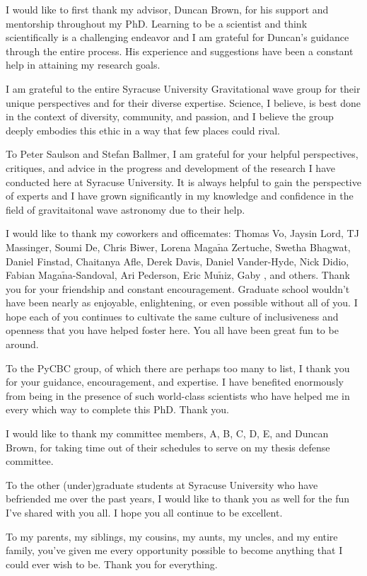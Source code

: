 I would like to first thank my advisor, Duncan Brown, for his support and mentorship throughout my PhD. Learning
to be a scientist and think scientifically is a challenging endeavor and I am grateful for Duncan's guidance through
the entire process. His experience and suggestions have been a constant help in attaining my research goals.

I am grateful to the entire Syracuse University Gravitational wave group for their unique perspectives and for their
diverse expertise. Science, I believe, is best done in the context of diversity, community, and passion, and I believe
the group deeply embodies this ethic in a way that few places could rival.

To Peter Saulson and Stefan Ballmer, I am grateful for your helpful perspectives, critiques, and advice in the
progress and development of the research I have conducted here at Syracuse University. It is always helpful to
gain the perspective of experts and I have grown significantly in my knowledge and confidence in the field of
gravitaitonal wave astronomy due to their help.

I would like to thank my coworkers and officemates: Thomas Vo, Jaysin Lord, TJ Massinger, Soumi De, Chris Biwer,
Lorena Maga$\tilde{\text{n}}$a Zertuche, Swetha Bhagwat, Daniel Finstad, Chaitanya Afle, Derek Davis, Daniel Vander-Hyde, Nick Didio,
Fabian Maga$\tilde{\text{n}}$a-Sandoval, Ari Pederson, Eric Mu$\tilde{\text{n}}$iz, Gaby , and others.
Thank you for your friendship and constant encouragement.
Graduate school wouldn't have been nearly as enjoyable, enlightening, or even possible without all of you.
I hope each of you continues to
cultivate the same culture of inclusiveness and openness that you have helped foster here. You all have been great fun to be around.

To the PyCBC group, of which there are perhaps too many to list, I thank you for your guidance, encouragement, and
expertise. I have benefited enormously from being in the presence of such world-class scientists who have helped
me in every which way to complete this PhD. Thank you. 

I would like to thank my committee members, A, B, C, D, E, 
and Duncan Brown, for taking time out of their schedules to serve on my thesis defense committee.

To the other (under)graduate students at Syracuse University who have befriended me over the past years, I would
like to thank you as well for the fun I've shared with you all. I hope you all continue to be excellent. 

To my parents, my siblings, my cousins, my aunts, my uncles, and my entire family, you've given me every opportunity
possible to become anything that I could ever wish to be. Thank you for everything.

